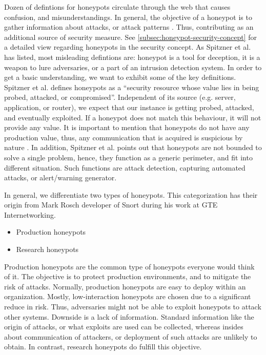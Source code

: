 Dozen of defintions for honeypots circulate through the web that causes confusion, and misunderstandings. In general, the objective of a honeypot is to gather information about attacks, or attack patterns \cite{NawrockiWSKS2016}. Thus, contributing as an additional source of security measure. See \autoref{subsec:honeypot-security-concept} for a detailed view regarding honeypots in the security concept. As Spitzner et al. \cite{Spitzner2003} has listed, most misleading defintions are: honeypot is a tool for deception, it is a weapon to lure adversaries, or a part of an intrusion detection system. In order to get a basic understanding, we want to exhibit some of the key definitions. Spitzner et al. \cite{Spitzner2003} defines honeypots as a \enquote{security resource whose value lies in being probed, attacked, or compromised}. Independent of its source (e.g. server, application, or router), we expect that our instance is getting probed, attacked, and eventually exploited. If a honeypot does not match this behaviour, it will not provide any value. It is important to mention that honeypots do not have any production value, thus, any communication that is acquired is suspicious by nature \cite{Spitzner2003}. In addition, Spitzner et al. points out that honeypots are not bounded to solve a single problem, hence, they function as a generic perimeter, and fit into different situation. Such functions are attack detection, capturing automated attacks, or alert/warning generator.

In general, we differentiate two types of honeypots. This categorization has their origin from Mark Rosch developer of Snort during his work at GTE Internetworking.

\begin{itemize}
    \item Production honeypots
    \item Research honeypots
\end{itemize}

Production honeypots are the common type of honeypots everyone would think of it. The objective is to protect production environments, and to mitigate the risk of attacks. Normally, production honeypots are easy to deploy within an organization. Mostly, low-interaction honeypots are chosen due to a significant reduce in risk. Thus, adversaries might not be able to exploit honeypots to attack other systems. Downside is a lack of information. Standard information like the origin of attacks, or what exploits are used can be collected, whereas insides about communication of attackers, or deployment of such attacks are unlikely to obtain. In contrast, research honeypots do fulfill this objective.\cite{Spitzner2003}

